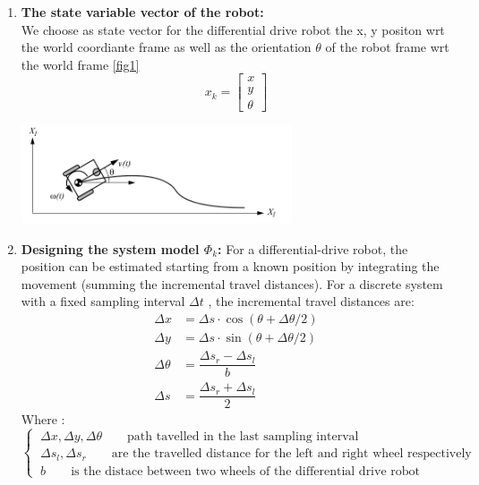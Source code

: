 \documentclass[11pt,a4paper]{report}
\begin{document}
\begin{enumerate}
\item \textbf{The state variable vector of the robot:}\\
We choose as state vector for the differential drive robot the x, y positon wrt the world coordiante frame as well as the orientation $\theta$ of the robot frame wrt the world frame \ref{fig1}	
$$ x_{k} = \left[ \begin{array}{c} x\\ y\\ \theta \end{array}\right]$$ 

\begin{center}\label{fig1}
	\includegraphics[width=8cm]{Capture1.png}
\end{center}

\item \textbf{Designing the system model $\Phi_{k}$:}
For a differential-drive robot, the position can be estimated starting from a known position by integrating the movement (summing the incremental travel distances).
For a discrete system with a fixed sampling interval $\Delta t$ , the incremental travel distances are:
\begin{eqnarray}
\Delta x &= \Delta s \cdot \cos (\theta + \Delta \theta /2) \nonumber\\
\Delta y &= \Delta s \cdot \sin (\theta + \Delta \theta /2) \nonumber\\
\Delta \theta &= \dfrac{\Delta s_{r} - \Delta s_{l}}{b} \label{eq1}\\
\Delta s &= \dfrac{\Delta s_{r} + \Delta s_{l}}{2} \label{eq2}
\end{eqnarray}
Where : \qquad $ \left\{\ \begin{array}{l} \Delta x, \Delta y , \Delta \theta \qquad \textrm{path tavelled in the last sampling interval} \\
\Delta s_{l}  ,\Delta s_{r} \qquad \textrm{are the travelled distance for the left and right wheel respectively } \\
b \qquad \textrm{is the distace between two wheels of the differential drive robot}
\end{array}\right.  
$ 


\end{enumerate}
\end{document}
